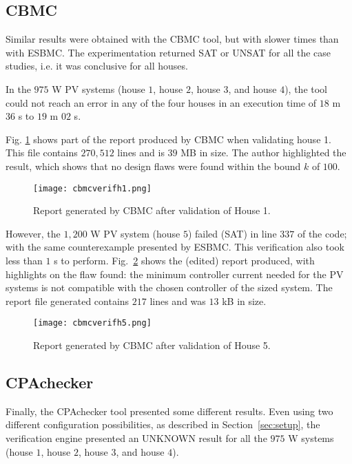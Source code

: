 \subsection{CBMC}

Similar results were obtained with the CBMC tool, but with slower times than with ESBMC. The experimentation returned SAT or UNSAT for all the case studies, i.e. it was conclusive for all houses. 

In the $975$ W PV systems (house $1$, house $2$, house $3$, and house $4$), the tool could not reach an error in any of the four houses in an execution time of $18$ m $36$ s to $19$ m $02$ s. 

Fig. \ref{fig:cbmcverifhouse1} shows part of the report produced by CBMC when validating house 1. This file contains $270,512$ lines and is $39$ MB in size. The author highlighted the result, which shows that no design flaws were found within the bound $k$ of $100$.

\begin{figure}[h]
\texttt{[image: cbmcverifh1.png]}
\centering
\caption{Report generated by CBMC after validation of House 1.}
\label{fig:cbmcverifhouse1}
\end{figure}

However, the $1,200$ W PV system (house $5$) failed (SAT) in line $337$ of the code; with the same counterexample presented by ESBMC. This verification also took less than $1$ s to perform. Fig.~\ref{fig:cbmcverifhouse5} shows the (edited) report produced, with highlights on the flaw found: the minimum controller current needed for the PV systems is not compatible with the chosen controller of the sized system. The report file generated contains $217$ lines and was $13$ kB in size.

\begin{figure}[h]
\texttt{[image: cbmcverifh5.png]}
\centering
\caption{Report generated by CBMC after validation of House 5.}
\label{fig:cbmcverifhouse5}
\end{figure}


\subsection{CPAchecker}

Finally, the CPAchecker tool presented some different results. Even using two different configuration possibilities, as described in Section~\ref{sec:setup}, the verification engine presented an UNKNOWN result for all the $975$ W systems (house $1$, house $2$, house $3$, and house $4$). 

